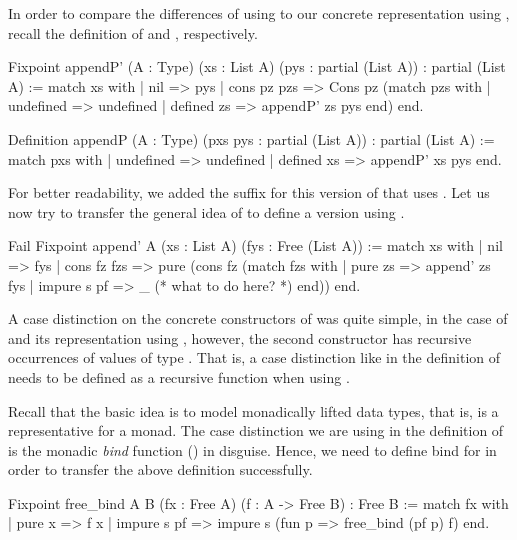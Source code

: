 In order to compare the differences of using  to our concrete representation using , recall the definition of  and , respectively.

\begin{coqcode}
Fixpoint appendP' (A : Type) (xs : List A) (pys : partial (List A))
  : partial (List A) :=
  match xs with
  | nil         => pys
  | cons pz pzs => Cons pz (match pzs with
                            | undefined  => undefined
                            | defined zs => appendP' zs pys
                            end)
  end.

Definition appendP (A : Type) (pxs pys : partial (List A))
  : partial (List A) :=
  match pxs with
  | undefined  => undefined
  | defined xs => appendP' xs pys
  end.
\end{coqcode}

For better readability, we added the suffix  for this version of  that uses .
Let us now try to transfer the general idea of  to define a version using .

\begin{coqcode}
Fail Fixpoint append' A (xs : List A) (fys : Free (List A)) :=
 match xs with
 | nil         => fys
 | cons fz fzs => pure (cons fz (match fzs with
                          | pure zs     => append' zs fys
                          | impure s pf => _ (* what to do here? *)
                          end))
 end.
\end{coqcode}

A case distinction on the concrete constructors of  was quite simple, in the case of  and its representation using , however, the second constructor  has recursive occurrences of values of type .
That is, a case distinction like in the definition of  needs to be defined as a recursive function when using .

Recall that the basic idea is to model monadically lifted data types, that is,  is a representative for a monad.
The case distinction we are using in the definition of  is the monadic \emph{bind} function (\cinl{(>>=)}) in disguise.
Hence, we need to define bind for  in order to transfer the above definition successfully.

\begin{coqcode}
Fixpoint free_bind A B (fx : Free A) (f : A -> Free B) : Free B :=
 match fx with
 | pure x      => f x
 | impure s pf => impure s (fun p => free_bind (pf p) f)
 end.
\end{coqcode}

